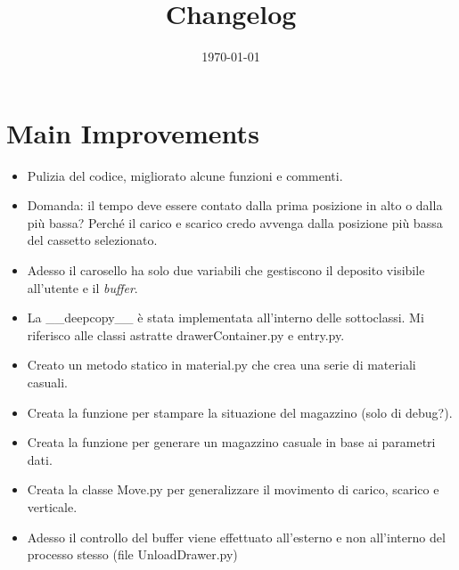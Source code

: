 \documentclass[a4paper]{article}
\begin{document}
	\title{Changelog}
	\date{\today}
	\maketitle
	
	\newpage
	
	\section*{Main Improvements}
	
	\begin{itemize}[label=]
		\item Pulizia del codice, migliorato alcune funzioni e commenti.
		
		\item Domanda: il tempo deve essere contato dalla prima posizione in alto o dalla più bassa? Perché il carico e scarico credo avvenga dalla posizione più bassa del cassetto selezionato.
		
		\item Adesso il carosello ha solo due variabili che gestiscono il deposito visibile all'utente e il \emph{buffer}.
		
		\item La \textsf{\_\_deepcopy\_\_} è stata implementata all'interno delle sottoclassi. Mi riferisco alle classi astratte \textsf{drawerContainer.py} e \textsf{entry.py}.
		
		\item Creato un metodo statico in \textsf{material.py} che crea una serie di materiali casuali.
		
		\item Creata la funzione per stampare la situazione del magazzino (solo di debug?).
		
		\item Creata la funzione per generare un magazzino casuale in base ai parametri dati.
		
		\item Creata la classe \textsf{Move.py} per generalizzare il movimento di carico, scarico e verticale.
		
		\item Adesso il controllo del buffer viene effettuato all'esterno e non all'interno del processo stesso (file \textsf{UnloadDrawer.py})
	\end{itemize}
\end{document}
